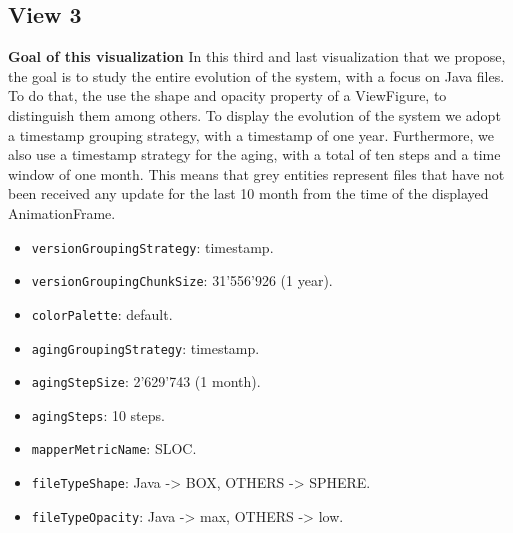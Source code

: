 \subsection{View 3}
\textbf{Goal of this visualization}
In this third and last visualization that we propose, the goal is to study the entire evolution of the system, with a focus on Java files. 
To do that, the use the shape and opacity property of a ViewFigure, to distinguish them among others. 
To display the evolution of the system we adopt a timestamp grouping strategy, with a timestamp of one year. 
Furthermore, we also use a timestamp strategy for the aging, with a total of ten steps and a time window of one month. This means that grey entities represent files that have not been received any update for the last 10 month from the time of the displayed AnimationFrame. 
\begin{itemize}
    \item \texttt{versionGroupingStrategy}: timestamp.
    \item \texttt{versionGroupingChunkSize}: 31'556'926 (1 year). 
    \item \texttt{colorPalette}: default.
    \item \texttt{agingGroupingStrategy}: timestamp.
    \item \texttt{agingStepSize}: 2'629'743 (1 month).
    \item \texttt{agingSteps}: 10 steps. 
    \item \texttt{mapperMetricName}: SLOC. 
    \item \texttt{fileTypeShape}: Java -> BOX, OTHERS -> SPHERE. 
    \item \texttt{fileTypeOpacity}: Java -> max, OTHERS -> low. 
\end{itemize}

